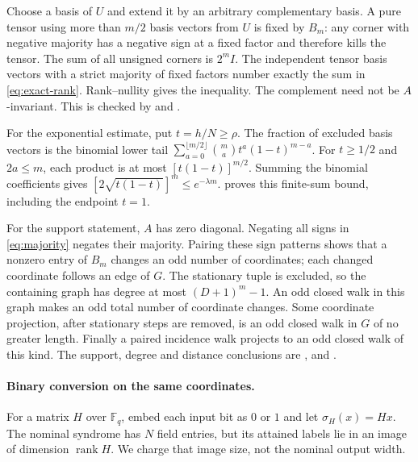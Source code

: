 \begin{outline}
Choose a basis of $U$ and extend it by an arbitrary complementary basis.
A pure tensor using more than $m/2$ basis vectors from $U$ is fixed by
$B_m$: any corner with negative majority has a negative sign at a fixed
factor and therefore kills the tensor. The sum of all unsigned corners
is $2^mI$. The independent tensor basis vectors with a strict majority
of fixed factors number exactly the sum in \cref{eq:exact-rank}.
Rank--nullity gives the inequality. The complement need not be
$A$-invariant. This is checked by
 and
.

For the exponential estimate, put $t=h/N\ge\rho$. The fraction of
excluded basis vectors is the binomial lower tail
$\sum_{a=0}^{\lfloor m/2\rfloor}\binom ma t^a(1-t)^{m-a}$.
For $t\ge1/2$ and $2a\le m$, each product is at most
$[t(1-t)]^{m/2}$. Summing the binomial coefficients gives
$[2\sqrt{t(1-t)}]^m\le e^{-\lambda m}$.
 proves this finite-sum
bound, including the endpoint $t=1$.

For the support statement, $A$ has zero diagonal. Negating all signs
in \cref{eq:majority} negates their majority. Pairing these sign patterns
shows that a nonzero entry of $B_m$ changes an odd number of coordinates;
each changed coordinate follows an edge of $G$. The stationary tuple
is excluded, so the containing graph has degree at most $(D+1)^m-1$.
An odd closed walk in this graph makes an odd total number of coordinate
changes. Some coordinate projection, after stationary steps are removed,
is an odd closed walk in $G$ of no greater length. Finally a paired
incidence walk projects to an odd closed walk of this kind. The support,
degree and distance conclusions are
,
 and
.
\end{outline}

\paragraph{Binary conversion on the same coordinates.}
For a matrix $H$ over $\mathbb F_q$, embed each input bit as $0$ or $1$
and let $\sigma_H(x)=Hx$. The nominal syndrome has $N$ field entries,
but its attained labels lie in an image of dimension $\operatorname{rank}H$.
We charge that image size, not the nominal output width.


